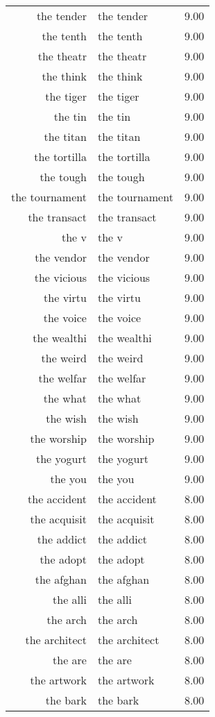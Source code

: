 \begin{table}[ht]
\begin{tabular}{rlr}
  the tender & the tender & 9.00 \\ 
  the tenth & the tenth & 9.00 \\ 
  the theatr & the theatr & 9.00 \\ 
  the think & the think & 9.00 \\ 
  the tiger & the tiger & 9.00 \\ 
  the tin & the tin & 9.00 \\ 
  the titan & the titan & 9.00 \\ 
  the tortilla & the tortilla & 9.00 \\ 
  the tough & the tough & 9.00 \\ 
  the tournament & the tournament & 9.00 \\ 
  the transact & the transact & 9.00 \\ 
  the v & the v & 9.00 \\ 
  the vendor & the vendor & 9.00 \\ 
  the vicious & the vicious & 9.00 \\ 
  the virtu & the virtu & 9.00 \\ 
  the voice & the voice & 9.00 \\ 
  the wealthi & the wealthi & 9.00 \\ 
  the weird & the weird & 9.00 \\ 
  the welfar & the welfar & 9.00 \\ 
  the what & the what & 9.00 \\ 
  the wish & the wish & 9.00 \\ 
  the worship & the worship & 9.00 \\ 
  the yogurt & the yogurt & 9.00 \\ 
  the you & the you & 9.00 \\ 
  the accident & the accident & 8.00 \\ 
  the acquisit & the acquisit & 8.00 \\ 
  the addict & the addict & 8.00 \\ 
  the adopt & the adopt & 8.00 \\ 
  the afghan & the afghan & 8.00 \\ 
  the alli & the alli & 8.00 \\ 
  the arch & the arch & 8.00 \\ 
  the architect & the architect & 8.00 \\ 
  the are & the are & 8.00 \\ 
  the artwork & the artwork & 8.00 \\ 
  the bark & the bark & 8.00 \\ 

\end{tabular}
\end{table}

